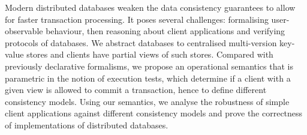 Modern distributed databases weaken the data consistency guarantees 
to allow for faster transaction processing. 
It poses several challenges: formalising user-observable behaviour,
then reasoning about client applications 
and verifying protocols of databases.
We abstract databases to centralised multi-version key-value stores and 
clients have partial views of such stores.
Compared with previously declarative formalisms,
we propose an operational semantics that is parametric in the notion of execution tests, 
which determine if a client with a given view is allowed to commit a transaction,
hence to define different consistency models. 
Using our semantics, 
we analyse the robustness of simple client applications 
against different consistency models and prove the correctness 
of implementations of distributed databases.
